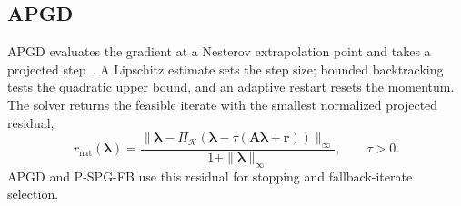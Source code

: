 \documentclass{article}
\newcommand{\Aop}{\mathbf{A}}         %
\newcommand{\blam}{\boldsymbol{\lambda}}
\newcommand{\rhs}{\mathbf{r}}
\newcommand{\Kadm}{\mathcal{K}}          %
\newcommand{\projK}{\Pi_{\Kadm}}
\theoremstyle{plain}
\theoremstyle{definition}
\begin{document}
\subsection{APGD}
\label{sec:apgd}
APGD evaluates the gradient at a
Nesterov extrapolation point and takes a projected
step~\cite{heyn2013,nesterov1983}. A Lipschitz estimate sets the step size;
bounded backtracking tests the quadratic upper bound, and an adaptive restart
resets the momentum. The solver returns the feasible iterate with the smallest
normalized projected residual,
\begin{equation}
r_{\mathrm{nat}}(\blam)=
\frac{\|\blam-\projK(\blam-\tau(\Aop\blam+\rhs))\|_\infty}
{1+\|\blam\|_\infty},\qquad \tau>0.
\label{eq:res_pg}
\end{equation}
APGD and P-SPG-FB use this residual for stopping and fallback-iterate selection.
\end{document}
